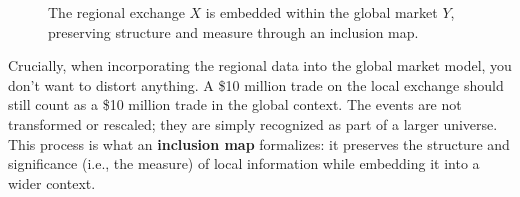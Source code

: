 \begin{figure}[H]
\centering
{}
\caption{The regional exchange \( X \) is embedded within the global market \( Y \), preserving structure and measure through an inclusion map.}
\end{figure}



Crucially, when incorporating the regional data into the global market model, you don’t want to distort anything. A \$10 million trade on the local exchange should still count as a \$10 million trade in the global context. The events are not transformed or rescaled; they are simply recognized as part of a larger universe. This process is what an \textbf{inclusion map} formalizes: it preserves the structure and significance (i.e., the measure) of local information while embedding it into a wider context.

